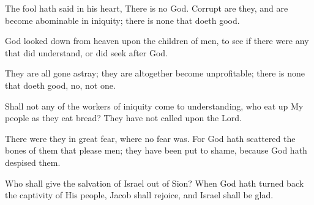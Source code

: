The fool hath said in his heart, There is no God. Corrupt are they, and are become abominable in iniquity; there is none that doeth good.

God looked down from heaven upon the children of men, to see if there were any that did understand, or did seek after God.

They are all gone astray; they are altogether become unprofitable; there is none that doeth good, no, not one.

Shall not any of the workers of iniquity come to understanding, who eat up My people as they eat bread? They have not called upon the Lord.

There were they in great fear, where no fear was. For God hath scattered the bones of them that please men; they have been put to shame, because God hath despised them.

Who shall give the salvation of Israel out of Sion? When God hath turned back the captivity of His people, Jacob shall rejoice, and Israel shall be glad.
